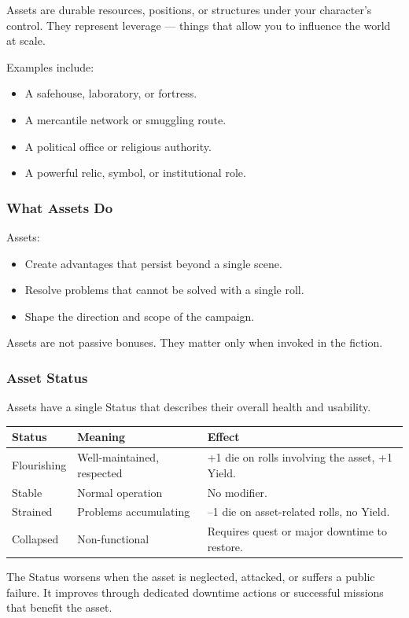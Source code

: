 Assets are durable resources, positions, or structures under your character's control. They represent leverage --- things that allow you to influence the world at scale.

Examples include:
\begin{itemize}
  \item A safehouse, laboratory, or fortress.
  \item A mercantile network or smuggling route.
  \item A political office or religious authority.
  \item A powerful relic, symbol, or institutional role.
\end{itemize}

\subsubsection{What Assets Do}
Assets:
\begin{itemize}
  \item Create advantages that persist beyond a single scene.
  \item Resolve problems that cannot be solved with a single roll.
  \item Shape the direction and scope of the campaign.
\end{itemize}
Assets are not passive bonuses. They matter only when invoked in the fiction.

\subsubsection{Asset Status}
Assets have a single Status that describes their overall health and usability.

\begin{tabular}{@{}lll@{}}
\toprule
\textbf{Status} & \textbf{Meaning} & \textbf{Effect} \\
\midrule
Flourishing & Well-maintained, respected & +1 die on rolls involving the asset, +1 Yield. \\
Stable & Normal operation & No modifier. \\
Strained & Problems accumulating & --1 die on asset-related rolls, no Yield. \\
Collapsed & Non-functional & Requires quest or major downtime to restore. \\
\bottomrule
\end{tabular}

The Status worsens when the asset is neglected, attacked, or suffers a public failure. It improves through dedicated downtime actions or successful missions that benefit the asset.

